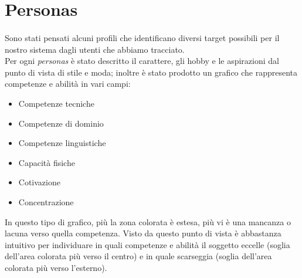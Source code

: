 \documentclass[12pt,a4paper]{report}
\begin{document}
\section{Personas}
\paragraph{}Sono stati pensati alcuni profili che identificano diversi target possibili per il nostro sistema dagli utenti che abbiamo tracciato.\\
Per ogni \textit{personas} è stato descritto il carattere, gli hobby e le aspirazioni dal punto di vista di stile e moda; inoltre è stato prodotto un grafico che rappresenta competenze e abilità in vari campi:
\begin{itemize}
  \item Competenze tecniche
  \item Competenze di dominio
  \item Competenze linguistiche
  \item Capacità fisiche
  \item Cotivazione
  \item Concentrazione
\end{itemize}
In questo tipo di grafico, più la zona colorata è estesa, più vi è una mancanza o lacuna verso quella competenza. Visto da questo punto di vista è abbastanza intuitivo per individuare in quali competenze e abilità il soggetto eccelle (soglia dell'area colorata più verso il centro) e in quale scarseggia (soglia dell'area colorata più verso l'esterno).
\end{document}
